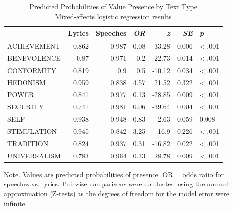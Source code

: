\begin{table}
\caption*{
{\large Predicted Probabilities of Value Presence by Text Type} \\ 
{\small Mixed-effects logistic regression results}
} 
\fontsize{12.0pt}{14.4pt}\selectfont
\begin{tabular*}{\linewidth}{@{\extracolsep{\fill}}l|rrrrrl}
\toprule
 & Lyrics & Speeches & \emph{OR} & \emph{z} & \emph{SE} & \emph{p} \\ 
\midrule\addlinespace[2.5pt]
ACHIEVEMENT & 0.862 & 0.987 & 0.08 & -33.28 & 0.006 & \textless{} .001 \\ 
BENEVOLENCE & 0.87 & 0.971 & 0.2 & -22.73 & 0.014 & \textless{} .001 \\ 
CONFORMITY & 0.819 & 0.9 & 0.5 & -10.12 & 0.034 & \textless{} .001 \\ 
HEDONISM & 0.959 & 0.838 & 4.57 & 21.52 & 0.322 & \textless{} .001 \\ 
POWER & 0.841 & 0.977 & 0.13 & -28.85 & 0.009 & \textless{} .001 \\ 
SECURITY & 0.741 & 0.981 & 0.06 & -39.64 & 0.004 & \textless{} .001 \\ 
SELF & 0.938 & 0.948 & 0.83 & -2.63 & 0.059 & 0.008 \\ 
STIMULATION & 0.945 & 0.842 & 3.25 & 16.9 & 0.226 & \textless{} .001 \\ 
TRADITION & 0.824 & 0.937 & 0.31 & -16.82 & 0.022 & \textless{} .001 \\ 
UNIVERSALISM & 0.783 & 0.964 & 0.13 & -28.78 & 0.009 & \textless{} .001 \\ 
\bottomrule
\end{tabular*}
\begin{minipage}{\linewidth}
Note. Values are predicted probabilities of presence. OR = odds ratio for speeches vs. lyrics. Pairwise comparisons were conducted using the normal approximation (Z-tests) as the degrees of freedom for the model error were infinite.\\
\end{minipage}
\end{table}

